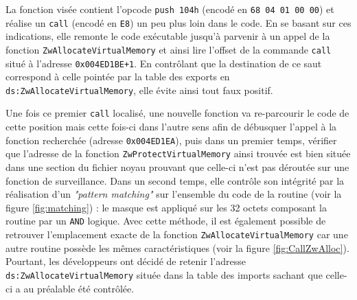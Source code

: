 \documentclass[times,11pt,fullpage]{article}
\begin{document}
La fonction visée contient l'opcode \texttt{push 104h} (encodé en \texttt{68 04 01 00 00}) et réalise un \texttt{call} (encodé en \texttt{E8}) un peu plus loin dans le code. En se basant sur ces indications, elle remonte le code exécutable jusqu'à parvenir à un appel de la fonction \texttt{ZwAllocateVirtualMemory} et ainsi lire l'offset de la commande \texttt{call} situé à l'adresse \texttt{0x004ED1BE+1}. En contrôlant que la destination de ce saut correspond à celle pointée par la table des exports en \texttt{ds:ZwAllocateVirtualMemory}, elle évite ainsi tout faux positif.   

Une fois ce premier \texttt{call} localisé, une nouvelle fonction va re-parcourir le code de cette position mais cette fois-ci dans l'autre sens afin de débusquer l'appel à la fonction recherchée (adresse \texttt{0x004ED1EA}), puis dans un premier temps, vérifier que l'adresse de la fonction \texttt{ZwProtectVirtualMemory} ainsi trouvée est bien située dans une section du fichier noyau prouvant que celle-ci n'est pas déroutée sur une fonction de surveillance. Dans un second temps, elle contrôle son intégrité par la réalisation d'un \emph{"pattern matching"} sur l'ensemble du code de la routine (voir la figure \ref{fig:matching}) : le masque est appliqué sur les 32 octets composant la routine par un \texttt{AND} logique. Avec cette méthode, il est également possible de retrouver l'emplacement exacte de la fonction \texttt{ZwAllocateVirtualMemory} car une autre routine possède les mêmes caractéristiques (voir la figure \ref{fig:CallZwAlloc}). Pourtant, les développeurs ont décidé de retenir l'adresse \texttt{
ds:ZwAllocateVirtualMemory} située dans la table des imports sachant que celle-ci a au préalable été contrôlée. 
\end{document}
